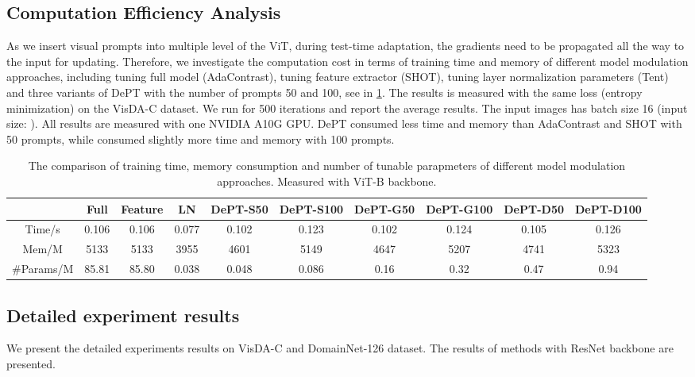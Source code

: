 \documentclass{article} \usepackage{iclr2023_conference,times}
\begin{document}
\subsection{Computation Efficiency Analysis}
As we insert visual prompts into multiple level of the ViT, during test-time adaptation, the gradients need to be propagated all the way to the input for updating. Therefore, we investigate the computation cost in terms of training time and memory of different model modulation approaches, including tuning full model (AdaContrast), tuning feature extractor (SHOT), tuning layer normalization parameters (Tent) and three variants of DePT with the number of prompts 50 and 100, see in \ref{appendix-tab:computation_analysis}. The results is measured with the same loss (entropy minimization) on the VisDA-C dataset.  We run for 500 iterations and report the average results. The input images has batch size 16 (input size: ). All results are measured with one NVIDIA A10G GPU.  DePT consumed less time and memory than AdaContrast and SHOT with 50 prompts, while consumed slightly more time and memory with 100 prompts.

\begin{table}[h]
    \centering
    \scriptsize
    \caption{The comparison of training time, memory consumption and number of tunable parapmeters of different model modulation approaches. Measured with ViT-B backbone.}
    \begin{tabular}{c|c|c|c|c|c|c|c|c|c}
         &  \bf Full & \bf Feature &\bf LN & \bf DePT-S50 & \bf DePT-S100 & \bf DePT-G50 &\bf DePT-G100 &\bf DePT-D50 & \bf DePT-D100\\ \toprule
    Time/s   &  0.106 & 0.106 & 0.077 & 0.102 & 0.123 & 0.102 & 0.124 & 0.105 & 0.126 \\ \hline
    Mem/M    & 5133 & 5133 & 3955 & 4601 & 5149 & 4647 & 5207 & 4741 & 5323 \\\hline
    \#Params/M & 85.81 & 85.80& 0.038 & 0.048 & 0.086 & 0.16 & 0.32 & 0.47 & 0.94 \\ \bottomrule
    \end{tabular}
    \label{appendix-tab:computation_analysis}
\end{table}

\subsection{Detailed experiment results}
We present the detailed experiments results on VisDA-C and DomainNet-126 dataset. The results of methods with ResNet backbone are presented.
\end{document}

